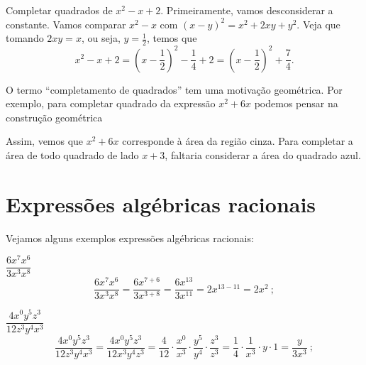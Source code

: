 \begin{exem}
  Completar quadrados de $x^2-x+2$.  Primeiramente, vamos desconsiderar a constante. Vamos comparar $x^2-x$ com $(x-y)^2=x^2+2xy+y^2$. Veja que tomando $2xy=x$, ou seja, $y=\frac{1}{2}$, temos que
  $$x^2-x+2 = \left(x-\frac{1}{2}\right)^2-\frac{1}{4}+2 = \left(x-\frac{1}{2}\right)^2+\frac{7}{4}.$$
\end{exem}

O termo ``completamento de quadrados'' tem uma motivação geométrica. Por exemplo, para completar quadrado da expressão $x^2+6x$ podemos pensar na construção geométrica
\begin{center}
\end{center}

Assim, vemos que $x^2+6x$ corresponde à área da região cinza. Para completar a área de todo quadrado de lado $x+3$, faltaria considerar a área do quadrado azul.

\section{Expressões algébricas racionais}
 
 Vejamos alguns exemplos expressões algébricas racionais:
 \begin{exem}    
  $\dfrac{6x^7 x^6}{3x^3x^8}$
\begin{equation*}
\dfrac{6x^7 x^6}{3x^3x^8}= \dfrac{6x^{7+6}}{3x^{3+8}}= \dfrac{6x^{13}}{3x^{11}}= 2x^{13-11}= 2x^2 \ ;
\end{equation*}
 \end{exem}
 
 \begin{exem}
  $\dfrac{4x^0y^5z^3}{12z^3y^4x^3}$
\begin{equation*}
\dfrac{4x^0y^5z^3}{12z^3y^4x^3}= \dfrac{4x^0y^5z^3}{12x^3y^4z^3}= \dfrac{4}{12} \cdot \dfrac{x^0}{x^3} \cdot \dfrac{y^5}{y^4} \cdot \dfrac{z^3}{z^3}= \dfrac{1}{4} \cdot \dfrac{1}{x^3} \cdot y \cdot 1=\dfrac{y}{3x^3} \ ;
\end{equation*}
  \end{exem}
 
